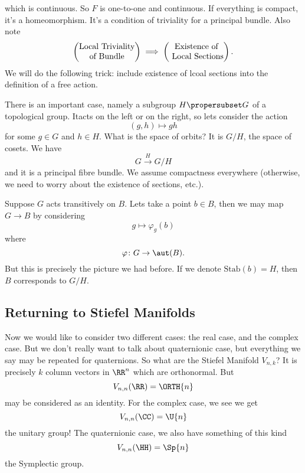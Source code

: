 which is continuous. So $F$ is one-to-one and continuous. If
everything is compact, it's a homeomorphism. It's a condition of
triviality for a principal bundle.
Also note
\begin{equation}\index{Section!Local}
\begin{pmatrix}
\mbox{Local Triviality}\\
\mbox{of Bundle}
\end{pmatrix} \implies \begin{pmatrix}\mbox{Existence
of}\\ \mbox{ Local Sections}
\end{pmatrix}.
\end{equation}
We will do the following trick: include existence of lcoal
sections into the definition of a free action.

There is an important case, namely a subgroup $H\propersubset G$
of a topological group. Itacts on the left or on the right, so
lets consider the action
\begin{equation}
(g,h)\mapsto gh
\end{equation}
for some $g\in G$ and $h\in H$. What is the space of orbits? It
is $G/H$, the space of cosets. We have
\begin{equation}
G\xrightarrow{H}G/H
\end{equation}
and it is a principal fibre bundle. We assume compactness
everywhere (otherwise, we need to worry about the existence of
sections, etc.).

Suppose $G$ acts transitively on $B$. Lets take a point $b\in B$,
then we may map $G\to B$ by considering
\begin{equation}
g\mapsto\varphi_{g}(b)
\end{equation}
where
\begin{equation}
\varphi\colon G\to\aut(B).
\end{equation}
But this is precisely the picture we had before. If we denote
$\mathrm{Stab}(b)=H$, then $B$ corresponds to $G/H$.

\subsection{Returning to Stiefel Manifolds}
Now we would like to consider two different cases: the real case,
and the complex case. But we don't really want to talk about
quaternionic case, but everything we say may be repeated for
quaternions. So what are the Stiefel Manifold $V_{n,k}$? It is
precisely $k$ column vectors in $\RR^n$ which are
orthonormal. But
\begin{equation}
V_{n,n}(\RR)=\ORTH{n}
\end{equation}
may be considered as an identity. For the complex case, we see we
get
\begin{equation}
V_{n,n}(\CC)=\U{n}
\end{equation}
the unitary group! The quaternionic case, we also have something
of this kind
\begin{equation}
V_{n,n}(\HH)=\Sp{n}
\end{equation}
the Symplectic group.

